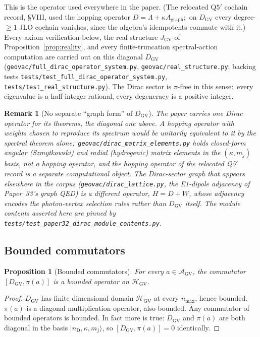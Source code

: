 \documentclass[11pt]{article}
\newtheorem{proposition}{Proposition}
\newtheorem{remark}{Remark}
\begin{document}
This is the operator used everywhere in the paper.  (The relocated
Q$5'$ cochain record, \S VIII, used the hopping operator $D = \Lambda +
\kappa A_{\mathrm{graph}}$;\ on $D_{\mathrm{GV}}$ every degree-$\ge 1$ JLO
cochain vanishes, since the algebra's idempotents commute with it.)
Every axiom verification below, the real structure $J_{\mathrm{GV}}$ of
Proposition~\ref{prop:reality}, and every finite-truncation spectral-action
computation are carried out on this diagonal $D_{\mathrm{GV}}$
(\texttt{geovac/full\_dirac\_operator\_system.py},
\texttt{geovac/real\_structure.py}; backing tests
\texttt{tests/test\_full\_dirac\_operator\_system.py},
\texttt{tests/test\_real\_structure.py}).  The Dirac sector is $\pi$-free
in this sense:\ every eigenvalue is a half-integer rational,
every degeneracy is a positive integer.

\begin{remark}[No separate ``graph form'' of $D_{\mathrm{GV}}$]
\label{rem:D_GV_no_graph_form}
The paper carries one Dirac operator for its theorems, the diagonal
one above.  A hopping operator with weights chosen to reproduce its
spectrum would be unitarily equivalent to it by the spectral theorem
alone;\ \texttt{geovac/dirac\_matrix\_elements.py} holds closed-form
angular (Szmytkowski) and radial (hydrogenic) matrix elements in the
$(\kappa, m_j)$ basis, not a hopping operator, and the hopping operator
of the relocated Q5$'$ record is a separate computational object.  The
Dirac-sector \emph{graph} that appears elsewhere in the corpus
(\texttt{geovac/dirac\_lattice.py}, the E1-dipole adjacency of
Paper~33's graph QED) is a different operator, $H = D + W$,
whose adjacency encodes the photon-vertex selection rules rather than
$D_{\mathrm{GV}}$ itself.  The module contents
asserted here are pinned by
\texttt{tests/test\_paper32\_dirac\_module\_contents.py}.
\end{remark}

\subsection{Bounded commutators}

\begin{proposition}[Bounded commutators]
\label{prop:bounded_commutators}
For every $a \in \mathcal{A}_{\mathrm{GV}}$, the commutator
$[D_{\mathrm{GV}}, \pi(a)]$ is a bounded operator on
$\mathcal{H}_{\mathrm{GV}}$.
\end{proposition}

\begin{proof}
$D_{\mathrm{GV}}$ has finite-dimensional domain
$\mathcal{H}_{\mathrm{GV}}$ at every $n_{\max}$, hence bounded.
$\pi(a)$ is a diagonal multiplication operator, also bounded.  Any
commutator of bounded operators is bounded.  In fact more is true:
$D_{\mathrm{GV}}$ and $\pi(a)$ are both diagonal in the basis
$|n_{\mathrm{D}}, \kappa, m_j\rangle$, so
$[D_{\mathrm{GV}}, \pi(a)] = 0$ identically.
\end{proof}
\end{document}
